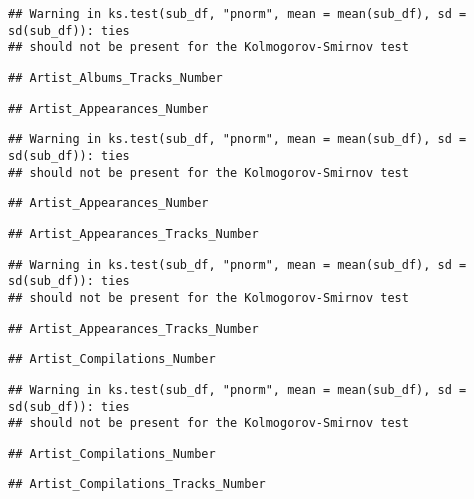 \documentclass[
]{article}
\begin{document}
\begin{verbatim}
## Warning in ks.test(sub_df, "pnorm", mean = mean(sub_df), sd = sd(sub_df)): ties
## should not be present for the Kolmogorov-Smirnov test
\end{verbatim}

\begin{verbatim}
## Artist_Albums_Tracks_Number
\end{verbatim}

\begin{verbatim}
## Artist_Appearances_Number
\end{verbatim}

\begin{verbatim}
## Warning in ks.test(sub_df, "pnorm", mean = mean(sub_df), sd = sd(sub_df)): ties
## should not be present for the Kolmogorov-Smirnov test
\end{verbatim}

\begin{verbatim}
## Artist_Appearances_Number
\end{verbatim}

\begin{verbatim}
## Artist_Appearances_Tracks_Number
\end{verbatim}

\begin{verbatim}
## Warning in ks.test(sub_df, "pnorm", mean = mean(sub_df), sd = sd(sub_df)): ties
## should not be present for the Kolmogorov-Smirnov test
\end{verbatim}

\begin{verbatim}
## Artist_Appearances_Tracks_Number
\end{verbatim}

\begin{verbatim}
## Artist_Compilations_Number
\end{verbatim}

\begin{verbatim}
## Warning in ks.test(sub_df, "pnorm", mean = mean(sub_df), sd = sd(sub_df)): ties
## should not be present for the Kolmogorov-Smirnov test
\end{verbatim}

\begin{verbatim}
## Artist_Compilations_Number
\end{verbatim}

\begin{verbatim}
## Artist_Compilations_Tracks_Number
\end{verbatim}
\end{document}

